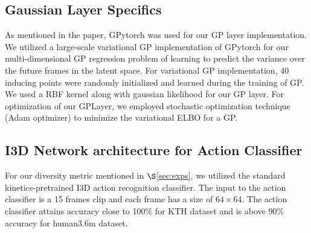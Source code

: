 \documentclass{article} \usepackage{iclr2021_conference,times}
\begin{document}
\subsection{Gaussian Layer Specifics}
As mentioned in the paper, GPytorch was used for our GP layer implementation. We utilized a large-scale variational GP implementation of GPytorch for our multi-dimensional GP regression problem of learning to predict the variance over the future frames in the latent space. For variational GP implementation, 40 inducing points were randomly initialized and learned during the training of GP. We used a RBF kernel along with gaussian likelihood for our GP layer. For optimization of our GPLayer, we employed stochastic optimization technique (Adam optimizer) to minimize the variational ELBO for a GP.

\subsection{I3D  Network architecture for Action Classifier}
For our diversity metric mentioned in $\S$\ref{sec:exps}, we utilized the standard kinetics-pretrained I3D action recognition classifier. The input to the action classifier is a 15 frames clip and each frame has a size of $64\times64$. The action classifier attains accuracy close to 100$\%$ for KTH dataset and is above 90$\%$ accuracy for human3.6m dataset.
\end{document}
